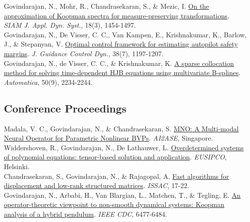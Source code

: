 \documentclass[10pt, a4paper]{article}
\newcommand{\years}[1]{\marginnote{\makebox[\marginparwidth][r]{\scriptsize\color{cvmuted}#1}} }
\begin{document}
\years{2019}Govindarajan, N., Mohr, R., Chandrasekaran, S., \& Mezic, I. \href{https://arxiv.org/pdf/1803.03920.pdf}{On the approximation of Koopman spectra for measure-preserving transformations}. \emph{SIAM J. Appl. Dyn. Syst.}, 18(3), 1454-1497. \\
\years{2015}Govindarajan, N., De Visser, C. C., Van Kampen, E., Krishnakumar, K., Barlow, J., \& Stepanyan, V. \href{https://arc.aiaa.org/doi/pdf/10.2514/1.G000271}{Optimal control framework for estimating autopilot safety margins}. \emph{J. Guidance Control Dyn.}, 38(7), 1197-1207. \\
\years{2014}Govindarajan, N., de Visser, C. C., \& Krishnakumar, K. \href{https://nithingovindarajan.github.io/assets/pdf/automaticapaper.pdf}{A sparse collocation method for solving time-dependent HJB equations using multivariate B-splines}. \emph{Automatica}, 50(9), 2234-2244.

\subsection*{Conference Proceedings}
\years{2026} Madala, V. C., Govindarajan, N., \& Chandrasekaran, S. \href{https://ai-2-ase.github.io/papers/CameraReadys%203-41/8/CameraReady/MNO_camera_ready.pdf}{MNO: A Multi-modal Neural Operator for Parametric Nonlinear BVPs}. \emph{AI2ASE}, Singapore. \\
\years{2023} Widdershoven, R., Govindarajan, N., De Lathauwer, L. \href{https://ftp.esat.kuleuven.be/pub/stadius//rwidders/widdershoven2023overdetermined.pdf}{Overdetermined systems of polynomial equations: tensor-based solution and application}. \emph{EUSIPCO}, Helsinki. \\
\years{2018} Chandrasekaran, S., Govindarajan, N., \& Rajagopal, A. \href{https://arxiv.org/pdf/1807.03437.pdf}{Fast algorithms for displacement and low-rank structured matrices}. \emph{ISSAC}, 17-22. \\
\years{2016} Govindarajan, N., Arbabi, H., Van Blargian, L., Matchen, T., \& Tegling, E. \href{https://nithingovindarajan.github.io/assets/pdf/CDCpaperPendulum_final.pdf}{An operator-theoretic viewpoint to non-smooth dynamical systems: Koopman analysis of a hybrid pendulum}. \emph{IEEE CDC}, 6477-6484.
\end{document}
